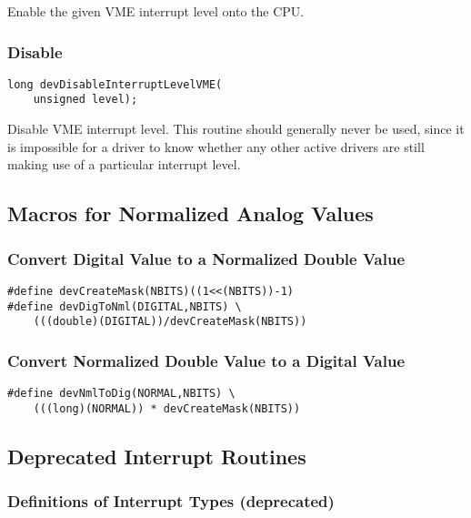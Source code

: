 Enable the given VME interrupt level onto the CPU.

\subsubsection{Disable}

\begin{verbatim}
long devDisableInterruptLevelVME(
    unsigned level);
\end{verbatim}

Disable VME interrupt level. This routine should generally never be used, since it is impossible for a driver to know 
whether any other active drivers are still making use of a particular interrupt level.

\subsection{Macros for Normalized Analog Values}

\subsubsection{Convert Digital Value to a Normalized Double Value}

\begin{verbatim}
#define devCreateMask(NBITS)((1<<(NBITS))-1)
#define devDigToNml(DIGITAL,NBITS) \
    (((double)(DIGITAL))/devCreateMask(NBITS))
\end{verbatim}

\subsubsection{Convert Normalized Double Value to a Digital Value}

\begin{verbatim}
#define devNmlToDig(NORMAL,NBITS) \
    (((long)(NORMAL)) * devCreateMask(NBITS))
\end{verbatim}

\subsection{Deprecated Interrupt Routines}

\subsubsection{Definitions of Interrupt Types (deprecated)}

